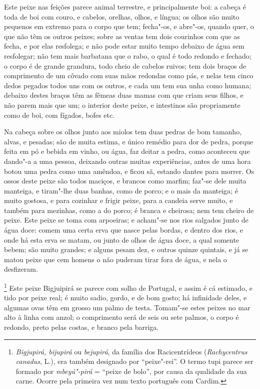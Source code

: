 \begin{linenumbers}
 Este peixe nas feições parece animal terrestre, e principalmente boi: a
cabeça é toda de boi com couro, e cabelos, orelhas, olhos, e língua; os
olhos são muito pequenos em extremo para o corpo que tem; fecha"-os, e
abre"-os, quando quer, o que não têm os outros peixes; sobre as ventas
tem dois courinhos com que as fecha, e por elas resfolega; e não pode
estar muito tempo debaixo de água sem resfolegar; não tem mais
barbatana que o rabo, o qual é todo redondo e fechado; o corpo é de
grande grandura, todo cheio de cabelos ruivos; tem dois braços de
comprimento de um côvado com suas mãos redondas como pás, e nelas tem
cinco dedos pegados todos uns com os outros, e cada um tem sua unha
como humana; debaixo destes braços têm as fêmeas duas mamas com que
criam seus filhos, e não parem mais que um; o interior deste peixe, e
intestinos são propriamente como de boi, com fígados, bofes etc.

 Na cabeça sobre os olhos junto aos miolos tem duas pedras de bom
tamanho, alvas, e pesadas; são de muita estima, e único remédio para
dor de pedra, porque feita em pó e bebida em vinho, ou água, faz deitar
a pedra, como aconteceu que dando"-a a uma pessoa, deixando outras
muitas experiências, antes de uma hora botou uma pedra como uma
amêndoa, e ficou sã, estando dantes para morrer. Os ossos deste peixe
são todos maciços, e brancos como marfim; faz"-se dele muita manteiga,
e tiram"-lhe duas banhas, como de porco; e o mais da manteiga; é muito
gostosa, e para cozinhar e frigir peixe, para a candeia serve muito, e
também para mezinhas, como a do porco; é branca e cheirosa; nem tem
cheiro de peixe. Este peixe se toma com arpoeiras; e acham"-se nos rios
salgados junto de água doce: comem uma certa erva que nasce pelas
bordas, e dentro dos rios, e onde há esta erva se matam, ou junto de
olhos de água doce, a qual somente bebem; são muito grandes; e alguns
pesam dez, e outros quinze quintais, e já se matou peixe que cem
homens o não puderam tirar fora de água, e nela o desfizeram.

\footnote{ \textit{Bigjupirá, bijupirá} ou
\textit{bejupirá}, da família dos Racicentrídeos (\textit{Rachycentrus
canadus}, L.), era também designado por ``peixe"-rei''. O termo tupi
parece ser formado por \textit{mbeyú"-pirá} = ``peixe de bolo'', por causa
da qualidade da sua carne. Ocorre pela primeira vez num texto português
com Cardim.} Este peixe Bigjuipirá se parece com solho de
Portugal, e assim é cá estimado, e tido por peixe real; é muito sadio,
gordo, e de bom gosto; há infinidade deles, e algumas ovas têm em
grosso um palmo de testa. Tomam"-se estes peixes no mar alto à linha
com anzol; o comprimento será de seis ou sete palmos, o corpo é
redondo, preto pelas costas, e branco pela barriga.


\end{linenumbers}
